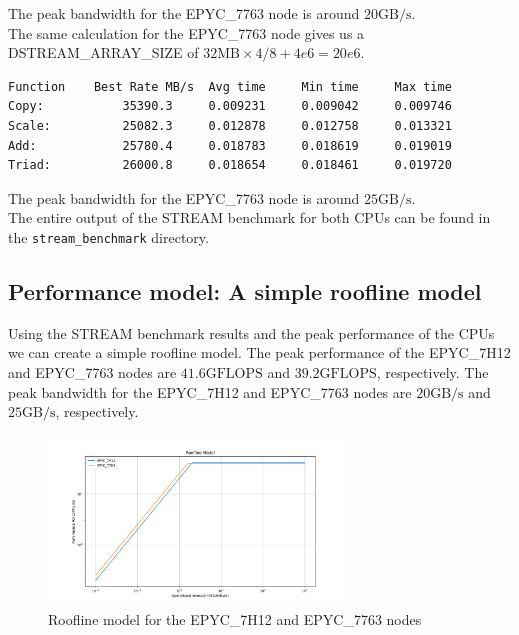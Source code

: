 \documentclass[unicode,11pt,a4paper,oneside,numbers=endperiod,openany]{scrartcl}
\begin{document}
The peak bandwidth for the EPYC\_7763 node is around $20\text{GB/s}$. \\

The same calculation for the EPYC\_7763 node gives us a DSTREAM\_ARRAY\_SIZE of $32\text{MB} \times 4 / 8 + 4e6 = 20e6$.

\begin{lstlisting}
Function    Best Rate MB/s  Avg time     Min time     Max time
Copy:           35390.3     0.009231     0.009042     0.009746
Scale:          25082.3     0.012878     0.012758     0.013321
Add:            25780.4     0.018783     0.018619     0.019019
Triad:          26000.8     0.018654     0.018461     0.019720
\end{lstlisting}

The peak bandwidth for the EPYC\_7763 node is around $25\text{GB/s}$. \\

The entire output of the STREAM benchmark for both CPUs can be found in the \texttt{stream\_benchmark} directory.

\subsection{Performance model: A simple roofline model}


Using the STREAM benchmark results and the peak performance of the CPUs we can create a simple roofline model. The peak performance of the EPYC\_7H12 and EPYC\_7763 nodes are $41.6\text{GFLOPS}$ and $39.2\text{GFLOPS}$, respectively. The peak bandwidth for the EPYC\_7H12 and EPYC\_7763 nodes are $20\text{GB/s}$ and $25\text{GB/s}$, respectively.

\begin{figure}[h]
    \centering
    \includegraphics[width=0.7\textwidth]{../01a/roofline_model/roofline.png}
    \caption{Roofline model for the EPYC\_7H12 and EPYC\_7763 nodes}
    \label{fig:roofline}
\end{figure}
\end{document}
